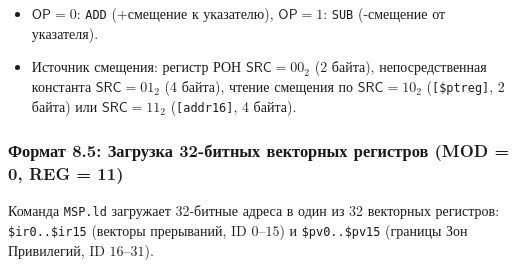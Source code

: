 \documentclass[11pt,a4paper]{article}
\newcommand{\field}[1]{\textsf{#1}}
\begin{document}
\begin{center}
\end{center}

\begin{itemize}
  \item $\field{OP} = 0$: \texttt{ADD} (+смещение к указателю), $\field{OP} = 1$: \texttt{SUB} (-смещение от указателя).
  \item Источник смещения: регистр РОН $\field{SRC}=00_2$ (2 байта), непосредственная константа $\field{SRC}=01_2$ (4 байта), чтение смещения по $\field{SRC}=10_2$ (\texttt{[\$ptreg]}, 2 байта) или $\field{SRC}=11_2$ (\texttt{[addr16]}, 4 байта).
\end{itemize}

\subsubsection{Формат 8.5: Загрузка 32-битных векторных регистров (MOD = 0, REG = 11)}
Команда \texttt{MSP.ld} загружает 32-битные адреса в один из 32 векторных регистров: \texttt{\$ir0..\$ir15} (векторы прерываний, ID $0$--$15$) и \texttt{\$pv0..\$pv15} (границы Зон Привилегий, ID $16$--$31$).
\end{document}
